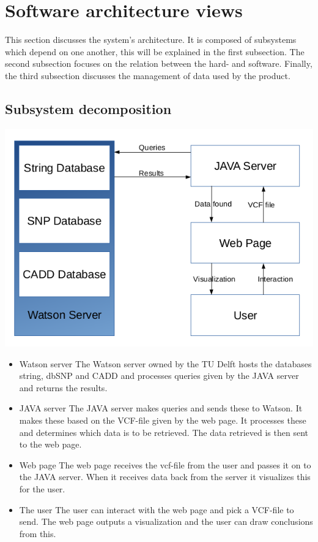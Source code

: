 \section{Software architecture views}
	This section discusses the system's architecture. It is composed of subsystems which depend on one another, this will be explained in the first subsection. The second subsection focuses on the relation between the hard- and software. Finally, the third subsection discusses the management of data used by the product.
	\subsection{Subsystem decomposition}
		\includegraphics[scale=0.5]{schema1.png}
		\begin{itemize}
			\item Watson server
				\subitem The Watson server owned by the TU Delft hosts the databases string\cite{string}, dbSNP\cite{dbSNP} and CADD\cite{CADD} and processes queries given by the JAVA server and returns the results.
			\item JAVA server
				\subitem The JAVA server makes queries and sends these to Watson. It makes these based on the VCF-file given by the web page. It processes these and determines which data is to be retrieved. The data retrieved is then sent to the web page.
			\item Web page
				\subitem The web page receives the vcf-file from the user and passes it on to the JAVA server. When it receives data back from the server it visualizes this for the user.
			\item The user 
				\subitem The user can interact with the web page and pick a VCF-file to send. The web page outputs a visualization and the user can draw conclusions from this.
		\end{itemize}
